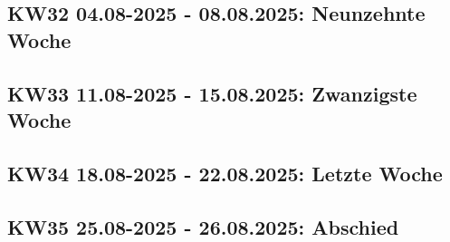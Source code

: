 \subsection{KW32 04.08-2025 - 08.08.2025: Neunzehnte Woche}


\subsection{KW33 11.08-2025 - 15.08.2025: Zwanzigste Woche}


\subsection{KW34 18.08-2025 - 22.08.2025: Letzte Woche}


\subsection{KW35 25.08-2025 - 26.08.2025: Abschied}
